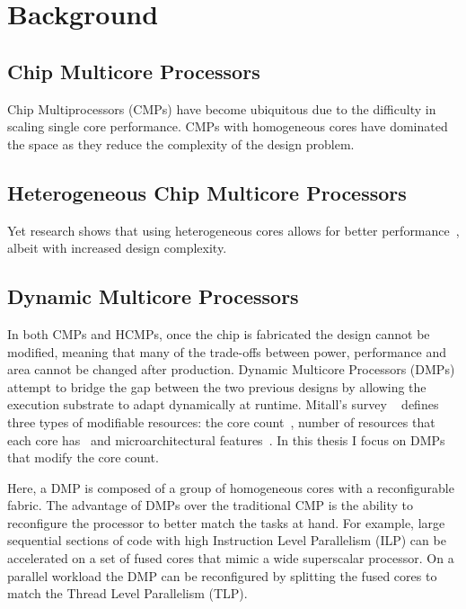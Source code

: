 \chapter{Background}

\section{Chip Multicore Processors}
Chip Multiprocessors (CMPs) have become ubiquitous due to the difficulty in scaling single core performance.
CMPs with homogeneous cores have dominated the space as they reduce the complexity of the design problem.

\section{Heterogeneous Chip Multicore Processors}
Yet research shows that using heterogeneous cores allows for better performance~\cite{suleman2009asymmetric}, albeit with increased design complexity. 

\section{Dynamic Multicore Processors}


In both CMPs and HCMPs, once the chip is fabricated the design cannot be modified, meaning that many of the trade-offs between power, performance and area cannot be changed after production.
Dynamic Multicore Processors (DMPs) attempt to bridge the gap between the two previous designs by allowing the execution substrate to adapt dynamically at runtime.
Mitall's survey ~\cite{MittalSurv2016} defines three types of modifiable resources: the core count~\cite{ipek2007CoreFusion}, number of resources that each core has~\cite{Homayoun3DPooling2012} and microarchitectural features~\cite{fallinhetblock2014,BauerRSE08,tavanaElastic}.
In this thesis I focus on DMPs that modify the core count.

Here, a DMP is composed of a group of homogeneous cores with a reconfigurable fabric.
The advantage of DMPs over the traditional CMP is the ability to reconfigure the processor to better match the tasks at hand.
For example, large sequential sections of code with high Instruction Level Parallelism (ILP) can be accelerated on a set of fused cores that mimic a wide superscalar processor.
On a parallel workload the DMP can be reconfigured by splitting the fused cores to match the Thread Level Parallelism (TLP).

